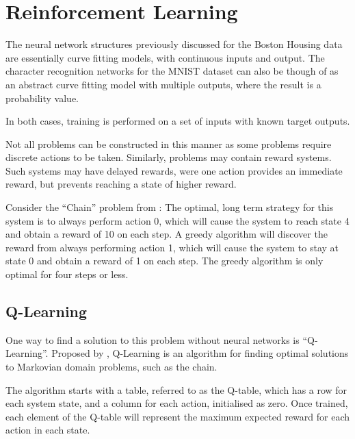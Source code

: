 \chapter{Reinforcement Learning}

The neural network structures previously discussed for the Boston Housing data
are essentially curve fitting models, with continuous inputs and output.
The character recognition networks for the MNIST dataset can also be though of
as an abstract curve fitting model with multiple outputs, where the result is
a probability value.

In both cases, training is performed on a set of inputs with known target
outputs.

Not all problems can be constructed in this manner as some problems require
discrete actions to be taken.
Similarly, problems may contain reward systems.
Such systems may have delayed rewards, were one action provides an immediate
reward, but prevents reaching a state of higher reward.

Consider the ``Chain'' problem from \cite{Strens:2000:ABF}:
The optimal, long term strategy for this system is to always perform action 0,
which will cause the system to reach state 4 and obtain a reward of 10 on each
step.
A greedy algorithm will discover the reward from always performing action 1,
which will cause the system to stay at state 0 and obtain a reward of 1 on each
step.
The greedy algorithm is only optimal for four steps or less.



\section{Q-Learning}

One way to find a solution to this problem without neural networks is
``Q-Learning''.
Proposed by \cite{Watkins:1989:Learning}, Q-Learning is an algorithm for finding
optimal solutions to Markovian domain problems, such as the chain.

The algorithm starts with a table, referred to as the Q-table, which has a row
for each system state, and a column for each action, initialised as zero.
Once trained, each element of the Q-table will represent the maximum expected
reward for each action in each state.

